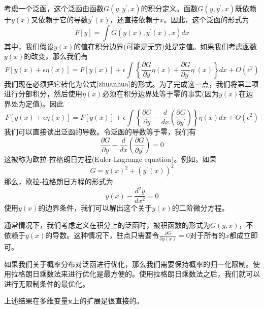 考虑一个泛函，这个泛函由函数$G(y,y^{'},x)$的积分定义。函数$G(y,y^{'},x)$既依赖于$y(x)$又依赖于它的导数$y^{'}(x)$，还直接依赖于$x$。因此，这个泛函的形式为
\begin{equation}
	F[y]=\int G(y(x),y^{'}(x),x)dx
\end{equation}
其中，我们假设$y(x)$的值在积分边界(可能是无穷)处是定值。如果我们考虑函数$y(x)$的改变，那么我们有
\begin{equation}
	F[y(x)+\epsilon\eta(x)]=F[y(x)]+\epsilon\int \left\{\frac{\partial G}{\partial y}\eta(x)+\frac{\partial G}{\partial y^{'}}\eta^{'}(x) \right\}dx +O(\epsilon^2)
\end{equation}
我们现在必须把它转化为公式$\ref{zhuanhua}$的形式。为了完成这一点，我们将第二项进行分部积分，然后使用$\eta(x)$必须在积分边界处等于零的事实(因为$y(x)$在边界处为定值)。因此
\begin{equation}
		F[y(x)+\epsilon\eta(x)]=F[y(x)]+\epsilon\int \left\{\frac{\partial G}{\partial y}-\frac{d}{dx }\left(\frac{\partial G}{\partial y^{'}} \right) \right\}\eta(x)dx +O(\epsilon^2)
\end{equation}
我们可以直接读出泛函的导数。令泛函的导数等于零，我们有
\begin{equation}
	\frac{\partial G}{\partial y} - \frac{d}{dx}\left(\frac{\partial G}{\partial y^{'}} \right)=0
\end{equation}
这被称为欧拉-拉格朗日方程(Euler-Lagrange equation)。例如，如果
\begin{equation}
	G=y(x)^2+(y^{'}(x))^2
\end{equation}
那么，欧拉-拉格朗日方程的形式为
\begin{equation}
	y(x)-\frac{d^2y}{dx^2}=0
\end{equation}
使用$y(x)$的边界条件，我们可以解出这个关于$y(x)$的二阶微分方程。

通常情况下，我们考虑定义在积分上的泛函时，被积函数的形式为$G(y,x)$，不依赖于$y(x)$的导数。这种情况下，驻点只需要令$\frac{\partial G}{\partial y(x)}=0$对于所有的$x$都成立即可。

如果我们关于概率分布对泛函进行优化，那么我们需要保持概率的归一化限制。使用拉格朗日乘数法来进行优化是最方便的。使用拉格朗日乘数法之后，我们就可以进行无限制条件的最优化。

上述结果在多维变量$\boldsymbol{x}$上的扩展是很直接的。